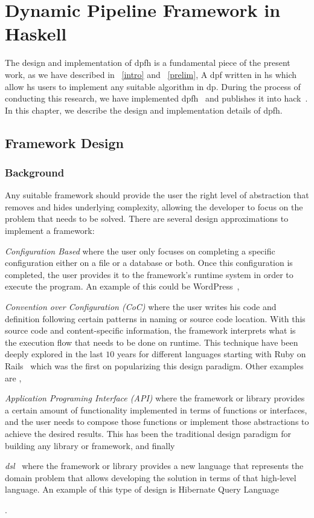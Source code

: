 \chapter{Dynamic Pipeline Framework in Haskell}\label{dp-hs}
The design and implementation of \acrfull{dpfh} is a fundamental piece of the present work, as we have described in ~\autoref{intro} and ~\autoref{prelim},
A \acrlong{dpf} written in \acrlong{hs} which allow \acrshort{hs} users to implement any suitable algorithm in \acrlong{dp}.
During the process of conducting this research, we have implemented \acrshort{dpfh}~\cite{dynamic-pipeline} and publishes it into \acrlong{hack}~\cite{hackage}.
In this chapter, we describe the design and implementation details of \acrshort{dpfh}.

\section{Framework Design}

\subsection{Background}
Any suitable framework should provide the user the right level of abstraction that removes and hides underlying complexity, 
allowing the developer to focus on the problem that needs to be solved.
There are several design approximations to implement a framework: \begin{inparaenum}[i\upshape)]
  \item  \emph{Configuration Based} where the user only focuses on completing a specific configuration either on a file or a database or both. Once this configuration is completed, the user provides it to the framework's runtime system in order to execute the program. An example of this could be WordPress~\cite{wordpress},
  \item  \emph{Convention over Configuration (CoC)} where the user writes his code and definition following certain patterns in naming or source code location. With this source code and content-specific information, the framework interprets what is the execution flow that needs to be done on runtime. This technique have been deeply explored in the last $10$ years for different languages starting with Ruby on Rails~\cite{rubyonrails} which was the first on popularizing this design paradigm. Other examples are \cite{springboot, cakephp},
  \item \emph{Application Programing Interface (API)} where the framework or library provides a certain amount of functionality implemented in terms of functions or interfaces, and the user needs to compose those functions or implement those abstractions to achieve the desired results. This has been the traditional design paradigm for building any library or framework, and finally
  \item \emph{\acrfull{dsl}}~\cite{Fowler10} where the framework or library provides a new language that represents the domain problem that allows developing the solution in terms of that high-level language. An example of this type of design is Hibernate Query Language~\cite{hql}
   \end{inparaenum}.

